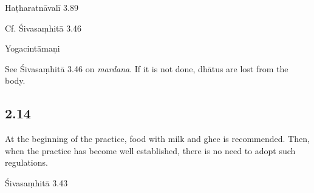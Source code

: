 \begin{ekdosis}
\begin{testimonia}[hp02_013]
Haṭharatnāvalī 3.89

\begin{versinnote}
\end{versinnote}

Cf. Śivasaṃhitā 3.46

\begin{versinnote}
\end{versinnote}

Yogacintāmaṇi

\begin{versinnote}
\end{versinnote}
\end{testimonia}

\begin{philcomm}[hp02_013]
See Śivasaṃhitā 3.46 on \emph{mardana}. If it is not done, dhātus are lost from the body.
\end{philcomm}


\subsection*{2.14}
\begin{translation}[hp02_014]
At the beginning of the practice, food with milk and ghee is recommended. Then, when the practice has become well established, there is no need to adopt such regulations.
\end{translation}

\begin{sources}[hp02_014]
Śivasaṃhitā 3.43

\begin{versinnote}
\end{versinnote}
\end{sources}


\end{ekdosis}
